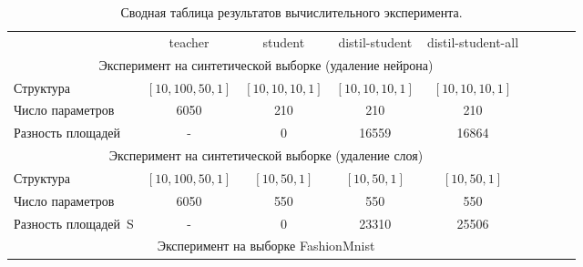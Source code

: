 \documentclass[12pt]{a&t}
\begin{document}
\begin{table}[]
\caption{Сводная таблица результатов вычислительного эксперимента.}
\label{tb:fn:1}
\begin{center}
\begin{tabular}{|l|c|c|c|c|llll}
\cline{1-5}
                 & teacher           & student        & distil-student & distil-student-all &                           &                      &                      &                      \\ \cline{1-5}
\multicolumn{5}{|c|}{Эксперимент на синтетической выборке (удаление нейрона)}             &                      &                      &                      &                      \\ \cline{1-5}
Структура            & $[10,100,50,1]$   & $[10,10,10,1]$  & $[10,10,10,1]$ & $[10,10,10,1]$    &                      &                      &                      &                      \\ \cline{1-5}
Число параметров  & 6050                    & 210                   & 210                  & 210                      &                      &                      &                      &                      \\ \cline{1-5}
Разность площадей   &   -                         & 0                       & 16559              & 16864                  &                      &                      &                      &                      \\ \cline{1-5}
\multicolumn{5}{|c|}{Эксперимент на синтетической выборке (удаление слоя)}                    & \multicolumn{1}{c}{} & \multicolumn{1}{c}{} & \multicolumn{1}{c}{} & \multicolumn{1}{c}{} \\ \cline{1-5}
Структура            & $[10,100,50,1]$   & $[10,50,1]$       & $[10,50,1]$      & $[10,50,1]$          &                      &                      &                      &                      \\ \cline{1-5}
Число параметров    &   6050                       &          550                &          550               &             550                &                      &                      &                      &                      \\ \cline{1-5}
Разность площадей~S    &  -                          &  0                      &  23310             & 25506                  &                      &                      &                      &                      \\ \cline{1-5}
\multicolumn{5}{|c|}{Эксперимент на выборке FashionMnist}                                                     &                      &                      &                      &                      \\ \cline{1-5}

\end{tabular}
\end{center}
\end{table}
\end{document}
